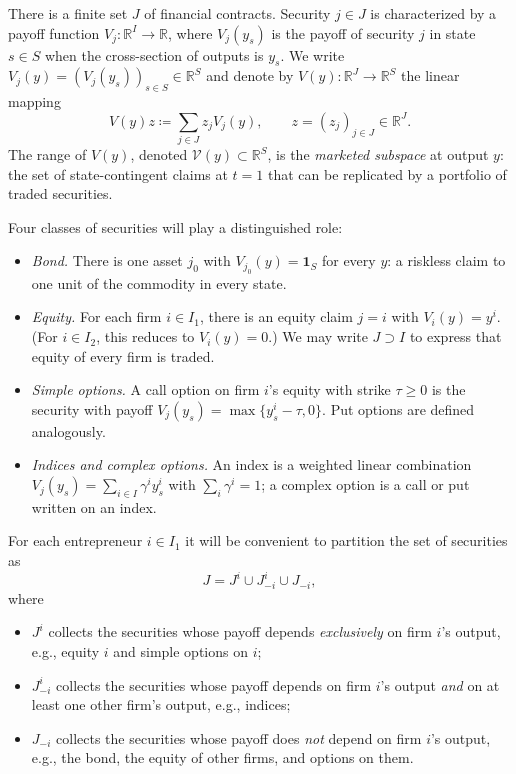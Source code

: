 \documentclass[11pt,a4paper,oneside]{book}
\def\R{\mathbb{R}}
\def\1{\mathbf{1}}
\def\geq{\geqslant}
\theoremstyle{plain}
\theoremstyle{definition}
\theoremstyle{remark}
\numberwithin{equation}{chapter}
\begin{document}
There is a finite set $J$ of financial contracts.
Security $j \in J$ is characterized by a payoff function $V_j : \R^I \to \R$, where $V_j(y_s)$ is the payoff of security $j$ in state $s \in S$ when the cross-section of outputs is $y_s$.
We write $V_j(y) = (V_j(y_s))_{s \in S} \in \R^S$ and denote by $V(y) : \R^J \to \R^S$ the linear mapping
\begin{equation*}
  V(y) z \coloneqq \sum_{j \in J} z_j V_j(y),
  \qquad z = (z_j)_{j \in J} \in \R^J.
\end{equation*}
The range of $V(y)$, denoted $\mathcal{V}(y) \subset \R^S$, is the \emph{marketed subspace} at output $y$: the set of state-contingent claims at $t=1$ that can be replicated by a portfolio of traded securities.

Four classes of securities will play a distinguished role:
\begin{itemize}
  \item \emph{Bond.}
  There is one asset $j_0$ with $V_{j_0}(y) = \1_S$ for every $y$: a riskless claim to one unit of the commodity in every state.
  \item \emph{Equity.}
  For each firm $i \in I_1$, there is an equity claim $j = i$ with $V_i(y) = y^i$.
  (For $i \in I_2$, this reduces to $V_i(y) = 0$.)
  We may write $J \supset I$ to express that equity of every firm is traded.
  \item \emph{Simple options.}
  A call option on firm $i$'s equity with strike $\tau \geq 0$ is the security with payoff $V_j(y_s) = \max\{ y^i_s - \tau, 0 \}$.
  Put options are defined analogously.
  \item \emph{Indices and complex options.}
  An index is a weighted linear combination $V_j(y_s) = \sum_{i \in I} \gamma^i y^i_s$ with $\sum_i \gamma^i = 1$; a complex option is a call or put written on an index.
\end{itemize}

For each entrepreneur $i \in I_1$ it will be convenient to partition the set of securities as
\begin{equation}\label{eq:partition-J}
  J = J^i \cup J^i_{-i} \cup J_{-i},
\end{equation}
where
\begin{itemize}
  \item $J^i$ collects the securities whose payoff depends \emph{exclusively} on firm $i$'s output, e.g., equity $i$ and simple options on $i$;
  \item $J^i_{-i}$ collects the securities whose payoff depends on firm $i$'s output \emph{and} on at least one other firm's output, e.g., indices;
  \item $J_{-i}$ collects the securities whose payoff does \emph{not} depend on firm $i$'s output, e.g., the bond, the equity of other firms, and options on them.
\end{itemize}
\end{document}
